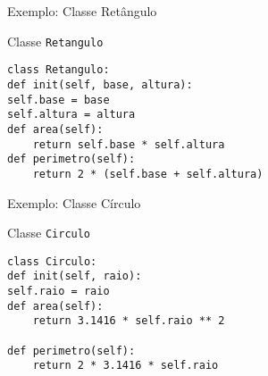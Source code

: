 \begin{frame}[fragile]{Exemplo: Classe Retângulo}

\begin{block}{Classe \texttt{Retangulo}}
\begin{verbatim}
class Retangulo:
def init(self, base, altura):
self.base = base
self.altura = altura
def area(self):
    return self.base * self.altura
def perimetro(self):
    return 2 * (self.base + self.altura)
\end{verbatim}
\end{block}
\end{frame}
\begin{frame}[fragile]{Exemplo: Classe Círculo}

\begin{block}{Classe \texttt{Circulo}}
\begin{verbatim}
class Circulo:
def init(self, raio):
self.raio = raio
def area(self):
    return 3.1416 * self.raio ** 2

def perimetro(self):
    return 2 * 3.1416 * self.raio
\end{verbatim}
\end{block}

\end{frame}
